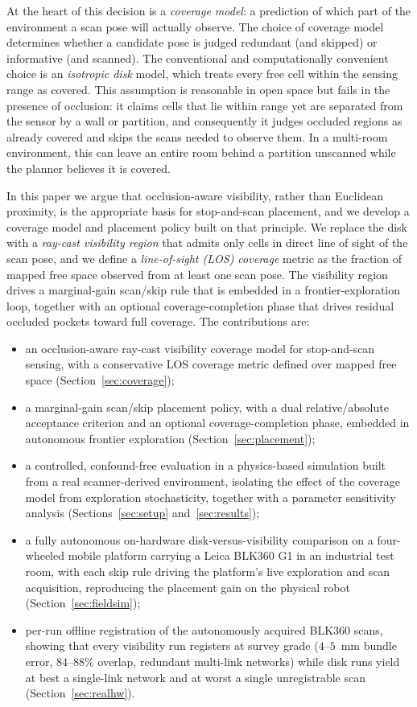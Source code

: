 \documentclass[sensors,article,submit,pdftex,moreauthors]{Definitions/mdpi}
\begin{document}
At the heart of this decision is a \emph{coverage model}: a prediction of which
part of the environment a scan pose will actually observe. The choice of
coverage model determines whether a candidate pose is judged redundant (and
skipped) or informative (and scanned). The conventional and computationally
convenient choice is an \emph{isotropic disk} model, which treats every free
cell within the sensing range as covered. This assumption is reasonable in open
space but fails in the presence of occlusion: it claims cells that lie within
range yet are separated from the sensor by a wall or partition, and consequently
it judges occluded regions as already covered and skips the scans needed to
observe them. In a multi-room environment, this can leave an entire room behind
a partition unscanned while the planner believes it is covered.

In this paper we argue that occlusion-aware visibility, rather than Euclidean
proximity, is the appropriate basis for stop-and-scan placement, and we develop
a coverage model and placement policy built on that principle. We replace the
disk with a \emph{ray-cast visibility region} that admits only cells in direct
line of sight of the scan pose, and we define a \emph{line-of-sight (LOS)
coverage} metric as the fraction of mapped free space observed from at least one
scan pose. The visibility region drives a marginal-gain scan/skip rule that is
embedded in a frontier-exploration loop, together with an optional
coverage-completion phase that drives residual occluded pockets toward full
coverage. The contributions are:

\begin{itemize}[leftmargin=*,labelsep=4.5mm]
\item an occlusion-aware ray-cast visibility coverage model for stop-and-scan
sensing, with a conservative LOS coverage metric defined over mapped free space
(Section~\ref{sec:coverage});
\item a marginal-gain scan/skip placement policy, with a dual relative/absolute
acceptance criterion and an optional coverage-completion phase, embedded in
autonomous frontier exploration (Section~\ref{sec:placement});
\item a controlled, confound-free evaluation in a physics-based simulation built
from a real scanner-derived environment, isolating the effect of the coverage
model from exploration stochasticity, together with a parameter sensitivity
analysis (Sections~\ref{sec:setup} and~\ref{sec:results});
\item a fully autonomous on-hardware disk-versus-visibility comparison on a
four-wheeled mobile platform carrying a Leica BLK360 G1 in an industrial test
room, with each skip rule driving the platform's live exploration and scan
acquisition, reproducing the placement gain on the physical robot
(Section~\ref{sec:fieldsim});
\item per-run offline registration of the autonomously acquired BLK360 scans,
showing that every visibility run registers at survey grade ($4$--$5$~mm bundle
error, $84$--$88\%$ overlap, redundant multi-link networks) while disk runs
yield at best a single-link network and at worst a single unregistrable scan
(Section~\ref{sec:realhw}).
\end{itemize}
\end{document}
